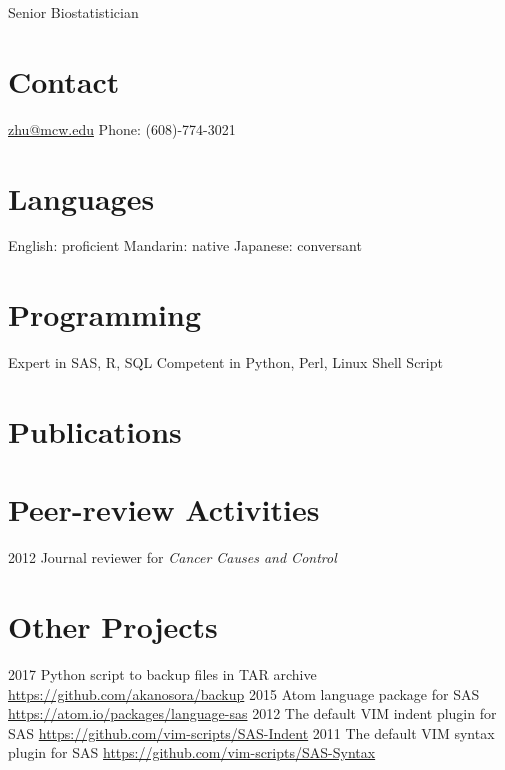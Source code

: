 \documentclass[11pt, print]{friggeri-cv}
\begin{document}
       {Senior Biostatistician}

\begin{aside}
  \section{Contact}
    \href{mailto:zhu@mcw.edu}{zhu@mcw.edu}
    Phone: (608)-774-3021
  \section{Languages}
    English: proficient
    Mandarin: native
    Japanese: conversant
  \section{Programming}
    Expert in SAS, R, SQL
    Competent in Python,
    Perl, Linux Shell Script
\end{aside}




\section{Publications}


\section{Peer-review Activities}

\begin{entrylist}
  \simpleentry
    {2012}
    {Journal reviewer for \textit{Cancer Causes and Control}}
    {}
\end{entrylist}

\section{Other Projects}

\begin{entrylist}
  \simpleentry
    {2017}
    {Python script to backup files in TAR archive}
    {\href{https://github.com/akanosora/backup}{https://github.com/akanosora/backup}}
  \simpleentry
    {2015}
    {Atom language package for SAS}
    {\href{https://atom.io/packages/language-sas}{https://atom.io/packages/language-sas}}
  \simpleentry
    {2012}
    {The default VIM indent plugin for SAS}
    {\href{https://github.com/vim-scripts/SAS-Indent}{https://github.com/vim-scripts/SAS-Indent}}
  \simpleentry
    {2011}
    {The default VIM syntax plugin for SAS}
    {\href{https://github.com/vim-scripts/SAS-Syntax}{https://github.com/vim-scripts/SAS-Syntax}}
\end{entrylist}
\end{document}
